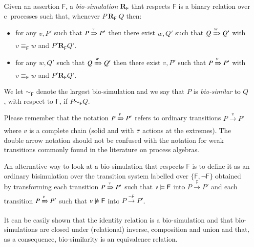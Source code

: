 \begin{definition}
Given an assertion $\mathsf{F}$, a \emph{bio-simulation} $\mathbf{R}_{\mathsf{F}}$ that respects $\mathsf{F}$ is a binary relation over c\CNA \  processes such that, whenever $P~\mathrel{\mathbf{R}_{\mathsf{F}}}~Q$ then:
 \begin{itemize} 
 \item
 for any $v,P'$ such that 
 $P \xRightarrow{v} P'$ then there exist $w,Q'$ such that $Q  \xRightarrow{w} Q'$ with $v\equiv_{\mathsf{F}} w$ and $P' \mathrel{\mathbf{R}_{\mathsf{F}}} Q'$.
\item
 for any $w,Q'$ such that 
 $Q \xRightarrow{w} Q'$ then there exist $v,P'$ such that $P  \xRightarrow{v} P'$ with $v\equiv_{\mathsf{F}} w$ and $P' \mathrel{\mathbf{R}_{\mathsf{F}}} Q'$.
\end{itemize}

We let $ \sim_{\mathsf{F}} $ denote the largest  bio-simulation and we say that $P$ is \emph{bio-similar} to $Q$, with respect to $\mathsf{F}$, if $P \sim_{\mathsf{F}} Q$.
\end{definition}

\begin{remark}
Please remember that the notation $P \xRightarrow{v} P'$ refers to ordinary transitions $P \xrightarrow{v} P'$ where $v$ is a complete chain (solid and with $\tau$ actions at the extremes).
The double arrow notation should not be confused with the notation for weak transitions commonly found in the literature on process algebras.
\end{remark}

\begin{remark}
An alternative way to look at a bio-simulation that respects $\mathsf{F}$ is to define it as an ordinary bisimulation over the transition system labelled over $\{\mathsf{F},\neg \mathsf{F}\}$ obtained by transforming each transition $P \xRightarrow{v} P'$ such that $v\models \mathsf{F}$ into $P \xrightarrow{\mathsf{F}} P'$ and  each transition $P \xRightarrow{v} P'$ such that $v\not\models \mathsf{F}$ into $P \xrightarrow{\neg \mathsf{F}} P'$.
\end{remark}

It can be easily shown that the identity relation is a bio-simulation and that bio-simulations are closed under (relational) inverse, composition and union and that, as a consequence, bio-similarity is an equivalence relation.


